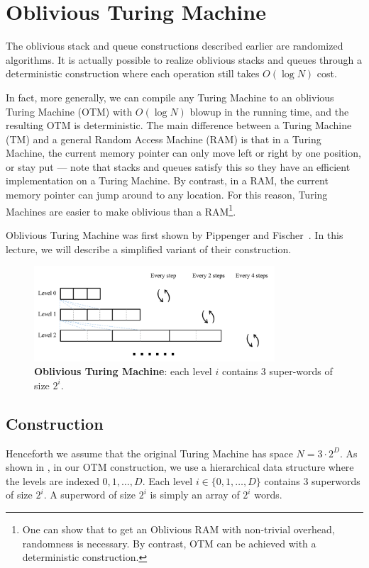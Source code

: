 \documentclass[11pt]{article}
\begin{document}
\section{Oblivious Turing Machine}

The oblivious stack and queue constructions
described earlier 
are randomized algorithms. 
It is actually possible to realize oblivious stacks
and queues through a deterministic 
construction where each operation still takes $O(\log N)$ cost. 

In fact, more generally, we can compile any Turing Machine
to an oblivious Turing Machine (OTM) with $O(\log N)$
blowup in the running time, and the resulting
OTM is deterministic.
The main difference between a Turing Machine (TM) and a general Random 
Access Machine (RAM) 
is that in a 
Turing Machine, the current memory pointer 
can only move left
or right by one position, or stay put --- note that stacks
and queues satisfy this so they have an efficient implementation on a Turing
Machine. 
By contrast, in a RAM, the current memory 
pointer can jump around to any location.
For this reason, Turing Machines are easier 
to make oblivious than a RAM\footnote{One can show that to get an Oblivious RAM
with non-trivial overhead, randomness is necessary. By contrast,
OTM can be achieved with a deterministic construction.}. 

Oblivious Turing Machine was first shown by 
Pippenger and Fischer~\cite{otm}. In this lecture, we will describe
a simplified variant of their construction.


\begin{figure}
    \centering
    \includegraphics[width=0.8\textwidth]{otm}
    \caption{{\bf Oblivious Turing Machine}: each level $i$ contains
3 super-words of size $2^i$. }
    \label{fig:otm}
\end{figure}

\subsection{Construction}
Henceforth we assume that the original Turing Machine 
has space $N = 3 \cdot 2^D$.
As shown in , 
in our OTM construction, we use a hierarchical data structure
where the levels are indexed $0, 1, \ldots, D$.
Each level $i \in \{0, 1, \ldots, D\}$ 
contains 3 superwords of size $2^i$.
A superword 
of size $2^i$ is simply an array of $2^i$ words.
\end{document}
